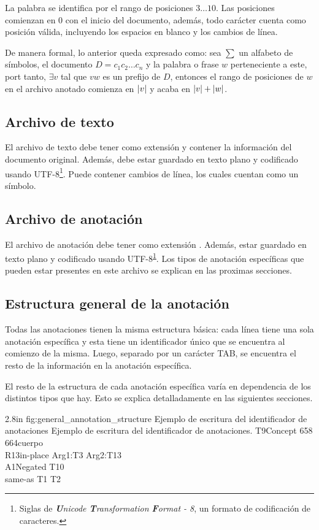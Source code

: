 La palabra  se identifica por el rango de posiciones $3\dots10$. Las posiciones comienzan en $0$ con el inicio del documento, además, todo carácter cuenta como posición válida, incluyendo los espacios en blanco y los cambios de línea.

De manera formal, lo anterior queda expresado como: sea $\sum$ un alfabeto de símbolos, el documento $D=c_1c_2\dots c_n$ y la palabra o frase $w$ perteneciente a este, port tanto, $\exists v$ tal que $vw$ es un prefijo de $D$, entonces el rango de posiciones de $w$ en el archivo anotado comienza en $\left|v\right|$ y acaba en $\left|v\right|+\left|w\right|$.

\subsection{Archivo de texto}
El archivo de texto debe tener como extensión  y contener la información del documento original. Además, debe estar guardado en texto plano y codificado usando UTF-8\footnote{\label{note:utf8}Siglas de \textit{\textbf{U}nicode \textbf{T}ransformation \textbf{F}ormat - 8}, un formato de codificación de caracteres.}. Puede contener cambios de línea, los cuales cuentan como un símbolo.

\subsection{Archivo de anotación}
El archivo de anotación debe tener como extensión . Además, estar guardado en texto plano y codificado usando UTF-8\textsuperscript{\ref{note:utf8}}. Los tipos de anotación específicas que pueden estar presentes en este archivo se explican en las proximas secciones.

\subsection{Estructura general de la anotación}
Todas las anotaciones tienen la misma estructura básica: cada línea tiene una sola anotación específica y esta tiene un identificador único que se encuentra al comienzo de la misma. Luego, separado por un carácter TAB, se encuentra el resto de la información en la anotación específica.

El resto de la estructura de cada anotación específica varía en dependencia de los distintos tipos que hay. Esto se explica detalladamente en las siguientes secciones.

\begin{annexample}
	[backgroundcolor=cyan!13]
	{2.8in}
	{fig:general_annotation_structure}
	{Ejemplo de escritura del identificador de anotaciones}
	{Ejemplo de escritura del identificador de anotaciones.}
	T9\space\space Concept 658 664\space cuerpo\\
	R13\space in-place Arg1:T3 Arg2:T13\\
	A1\space\space Negated T10\\
	\textasteriskcentered\space\space\space same-as T1 T2
\end{annexample}

